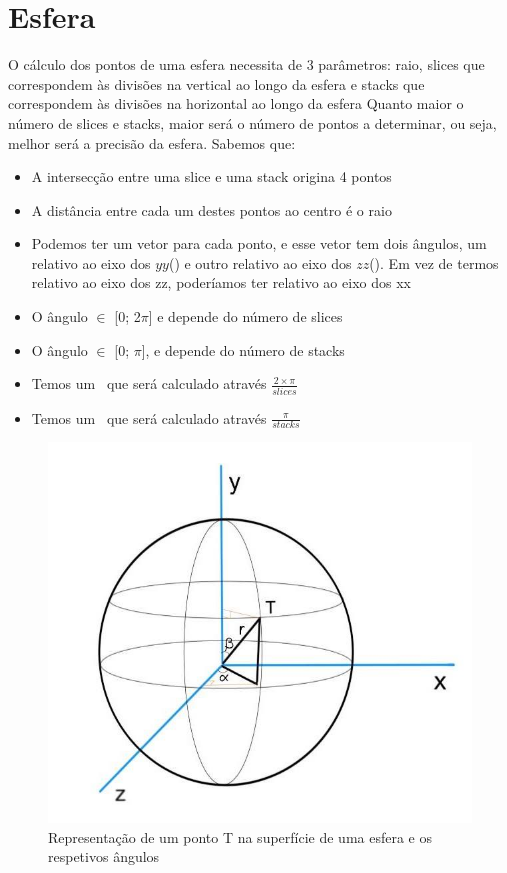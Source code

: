 \documentclass[12pt]{article}
\begin{document}
\section{Esfera}
O cálculo dos pontos de uma esfera necessita de 3 parâmetros: raio, slices que correspondem às divisões na vertical ao longo da esfera e stacks que correspondem às divisões na horizontal ao longo da esfera
Quanto maior o número de slices e stacks, maior será o número de pontos a determinar, ou seja, melhor será a precisão da esfera. Sabemos que:
\begin{itemize}
\item A intersecção entre uma slice e uma stack origina 4 pontos
\item A distância entre cada um destes pontos ao centro é o raio
\item Podemos ter um vetor para cada ponto, e esse vetor tem dois ângulos, um relativo ao eixo dos $yy$(\textbeta) e outro relativo ao eixo dos $zz$(\textalpha). Em vez de termos relativo ao eixo dos zz, poderíamos ter relativo ao eixo dos xx
\item O ângulo \textalpha $\in$ [0; 2$\pi$] e depende do número de slices
\item O ângulo \textbeta $\in$ [0; $\pi$], e depende do número de stacks
\item Temos um \textDelta\textalpha \ que será calculado através $\frac{2\times\pi}{slices}$
\item Temos um \textDelta\textbeta \ que será calculado através $\frac{\pi}{stacks}$
\end{itemize}
\begin{figure}[H]
\centering\includegraphics[scale=0.50]{esfera} 
\caption{\label{fig:controller}Representação de um ponto T na superfície de uma esfera e os respetivos ângulos}
\end{figure}
\end{document}
